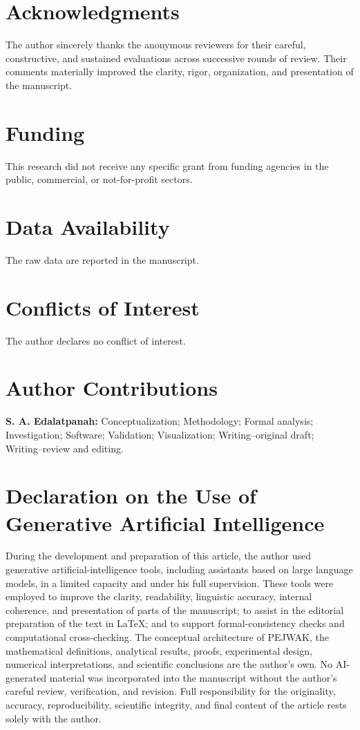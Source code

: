 \documentclass[reqno,11pt]{amsart}
\theoremstyle{definition}
\theoremstyle{plain}
\theoremstyle{remark}
\begin{document}

\section*{Acknowledgments}
The author sincerely thanks the anonymous reviewers for their careful,
constructive, and sustained evaluations across successive rounds of
review. Their comments materially improved the clarity, rigor,
organization, and presentation of the manuscript.

\section*{Funding}
This research did not receive any specific grant from funding agencies
in the public, commercial, or not-for-profit sectors.

\section*{Data Availability}
The raw data are reported in the manuscript.

\section*{Conflicts of Interest}
The author declares no conflict of interest.

\section*{Author Contributions}
\textbf{S. A. Edalatpanah:}
Conceptualization; Methodology; Formal analysis;
Investigation; Software; Validation; Visualization; Writing--original
draft; Writing--review and editing.
\section*{Declaration on the Use of Generative Artificial Intelligence}
During the development and preparation of this article, the author used
generative artificial-intelligence tools, including assistants based on
large language models, in a limited capacity and under his full
supervision. These tools were employed to improve the clarity,
readability, linguistic accuracy, internal coherence, and presentation
of parts of the manuscript; to assist in the editorial preparation of
the text in \LaTeX; and to support formal-consistency checks and
computational cross-checking. The conceptual architecture of PEJWAK, the
mathematical definitions, analytical results, proofs, experimental
design, numerical interpretations, and scientific conclusions are the
author's own. No AI-generated material was incorporated into the
manuscript without the author's careful review, verification, and
revision. Full responsibility for the originality, accuracy,
reproducibility, scientific integrity, and final content of the article
rests solely with the author.
\end{document}

